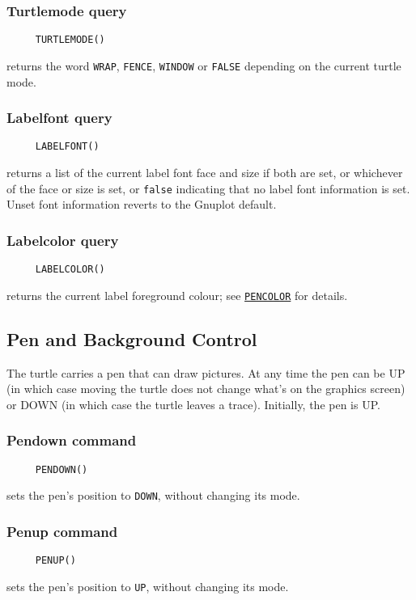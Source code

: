 \subsubsection*{Turtlemode query}
\begin{verbatim}
     TURTLEMODE()
\end{verbatim}
returns the word \texttt{WRAP}, \texttt{FENCE}, \texttt{WINDOW} or
\texttt{FALSE} depending on the current turtle mode.

\subsubsection*{Labelfont query}
\begin{verbatim}
     LABELFONT()
\end{verbatim}
\label{logoturtle:labelfont}
returns a list of the current label font face and size if both are
set, or whichever of the face or size is set, or \texttt{false}
indicating that no label font information is set.  Unset font
information reverts to the Gnuplot default.

\subsubsection*{Labelcolor query}
\begin{verbatim}
     LABELCOLOR()
\end{verbatim}
returns the current label foreground colour; see
\hyperref[logoturtle:pencolor]{\texttt{PENCOLOR}} for details.


\subsection{Pen and Background Control}
\label{logoturtle:PBC}

The turtle carries a pen that can draw pictures.  At any time the pen
can be UP (in which case moving the turtle does not change what's on the
graphics screen) or DOWN (in which case the turtle leaves a trace).
Initially, the pen is UP.

\subsubsection*{Pendown command}
\begin{verbatim}
     PENDOWN()
\end{verbatim}
sets the pen's position to \texttt{DOWN}, without changing its mode.

\subsubsection*{Penup command}
\begin{verbatim}
     PENUP()
\end{verbatim}
sets the pen's position to \texttt{UP}, without changing its mode.

